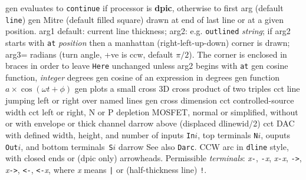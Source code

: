   {gen}
  {evaluates to {\tt continue}
    if processor is {\bf dpic}, otherwise to first arg (default {\tt line})}
  {gen}
  { Mitre (default filled square) drawn at end of last line or at a
    given position.
    arg1 default: current line thickness;
    arg2: e.g. {\tt outlined} {\sl string}; if arg2 starts with
    {\tt at} {\sl position} then a manhattan (right-left-up-down) corner
    is drawn;
    arg3= radians (turn angle, +ve is ccw, default $\pi/2$).
    The corner is enclosed in braces
    in order to leave {\tt Here} unchanged unless arg2 begins with {\tt at}
    }
  {gen}
  {cosine function, {\sl integer\/} degrees}
  {gen}
  {cosine of an expression in degrees}
  {gen}
  {function $a\times\cos(\omega t + \phi)$ }
  {gen}
  {plots a small cross}
  {3D}
  {cross product of two triples}
  {cct}
  {line jumping left or right over named lines}
  {gen}
  {cross dimension}
  {cct}
  {controlled-source width}
  {cct}
  {left or right, N or P depletion MOSFET, normal or simplified,
    without or with envelope or thick channel
    }
  {darrow}
  {above (displaced dlinewid/2)}
  {cct}
  {DAC with defined width, height, and number of inputs {\tt In$i$},
    top terminals {\tt N$i$}, ouputs {\tt Out$i$},
    and bottom terminals~{\tt S$i$} }
  {darrow}
  {See also {\tt Darc}.
   CCW arc in {\tt dline} style, with closed ends or (dpic only) arrowheads.
  Permissible {\sl terminals}:
  {\sl x}{\tt -},
  {\tt -}{\sl x}, {\sl x}{\tt -}{\sl x}, {\tt ->}, {\sl x}{\tt ->},
  {\tt <-}, {\tt <-}{\sl x}, {\tt <->}
  where {\sl x} means {\tt |} or (half-thickness line) {\tt !}.}
